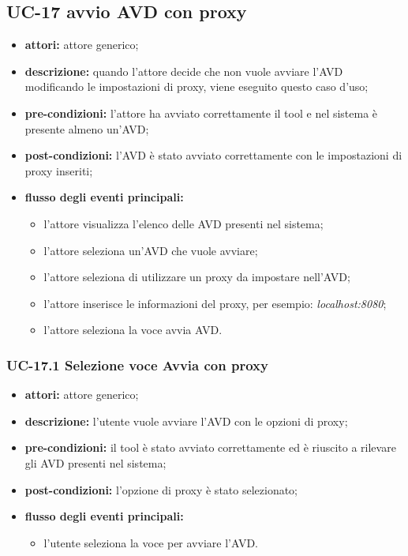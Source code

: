 \subsection*{UC-17 avvio AVD con proxy}\label{subsec:uc-16-avvio-avd-con-proxy}
\begin{itemize}
    \item \textbf{attori:} attore generico;
    \item \textbf{descrizione:} quando l'attore decide che non vuole avviare l'AVD modificando le impostazioni di proxy, viene eseguito questo caso d'uso;
    \item \textbf{pre-condizioni:} l'attore ha avviato correttamente il tool e nel sistema è presente almeno un'AVD;
    \item \textbf{post-condizioni:} l'AVD è stato avviato correttamente con le impostazioni di proxy inseriti;
    \item \textbf{flusso degli eventi principali:}
    \begin{itemize}
        \item l'attore visualizza l'elenco delle AVD presenti nel sistema;
        \item l'attore seleziona un'AVD che vuole avviare;
        \item l'attore seleziona di utilizzare un proxy da impostare nell'AVD;
        \item l'attore inserisce le informazioni del proxy, per esempio: \textit{localhost:8080};
        \item l'attore seleziona la voce avvia AVD.
    \end{itemize}
\end{itemize}
\subsubsection*{UC-17.1 Selezione voce Avvia con proxy}
\begin{itemize}
    \item \textbf{attori:} attore generico;
    \item \textbf{descrizione:} l'utente vuole avviare l'AVD con le opzioni di proxy;
    \item \textbf{pre-condizioni:} il tool è stato avviato correttamente ed è riuscito a rilevare gli AVD presenti nel sistema;
    \item \textbf{post-condizioni:} l'opzione di proxy è stato selezionato;
    \item \textbf{flusso degli eventi principali:}
    \begin{itemize}
        \item l'utente seleziona la voce per avviare l'AVD.
    \end{itemize}
\end{itemize}
